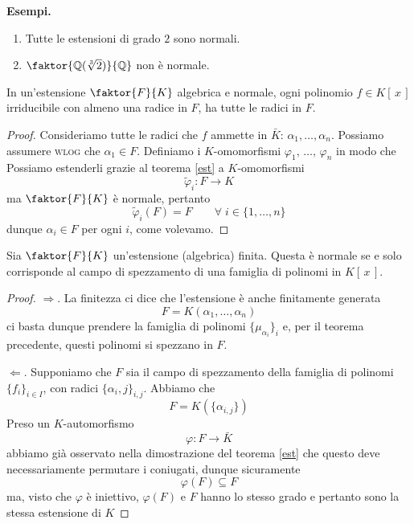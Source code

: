 \begin{multicols}{2}
\textbf{Esempi.}
\begin{enumerate}
	\item Tutte le estensioni di grado $ 2 $ sono normali.
	\item $ \faktor{\Q(\sqrt[3]{2})}{\Q} $ non è normale.
\end{enumerate}

\begin{theorem}
	In un'estensione $ \faktor{F}{K} $ algebrica e normale, ogni polinomio $ f \in K[\,x\,] $ irriducibile con almeno una radice in $ F $, ha tutte le radici in $ F $.
\end{theorem}
\begin{proof}
	Consideriamo tutte le radici che $ f $ ammette in $ \bar{K} $: $ \alpha_1, \dots, \alpha_n $. Possiamo assumere \textsc{wlog} che $ \alpha_1 \in F $. Definiamo i $ K $-omomorfismi $ \varphi_1,\, \dots,\, \varphi_n $ in modo che
	Possiamo estenderli grazie al teorema \ref{est} a $ K $-omomorfismi
	\[ \tilde{\varphi}_i \colon F \to K \] 
	ma $ \faktor{F}{K} $ è normale, pertanto 
	$$  \tilde{\varphi}_i(F) = F \qquad\forall \; i \in \{1, \dots, n\} $$
	dunque $ \alpha_i \in F $ per ogni $ i $, come volevamo.
	
\end{proof}

\begin{theorem}\label{carnorm}
	Sia $ \faktor{F}{K} $ un'estensione (algebrica) finita. Questa è normale se e solo corrisponde al campo di spezzamento di una famiglia di polinomi in $ K[\,x\,] $.
\end{theorem}
\begin{proof}
	$ \Rightarrow$. La finitezza ci dice che l'estensione è anche finitamente generata
	 \[ F = K(\alpha_1, \dots, \alpha_n ) \]
	ci basta dunque prendere la famiglia di polinomi $ \{\mu_{\alpha_i} \}_{i} $ e, per il teorema precedente, questi polinomi si spezzano in $ F $.
	
	$ \Leftarrow $. Supponiamo che $ F $ sia il campo di spezzamento della famiglia di polinomi $ \{f_i\}_{i \in I} $, con radici $ \{\alpha_i,j\}_{i,j} $. Abbiamo che 
	\[F = K(\{\alpha_{i, j}\})\]
	 Preso un $ K $-automorfismo
	 \[ \varphi \colon F \to \bar{K} \]
	 abbiamo già osservato nella dimostrazione del teorema \ref{est} che questo deve necessariamente permutare i coniugati, dunque sicuramente
	 \[ \varphi(F) \subseteq F \]
	 ma, visto che $ \varphi $ è iniettivo, $ \varphi(F) $ e $ F $ hanno lo stesso grado e pertanto sono la stessa estensione di $ K $
\end{proof}

\end{multicols}

